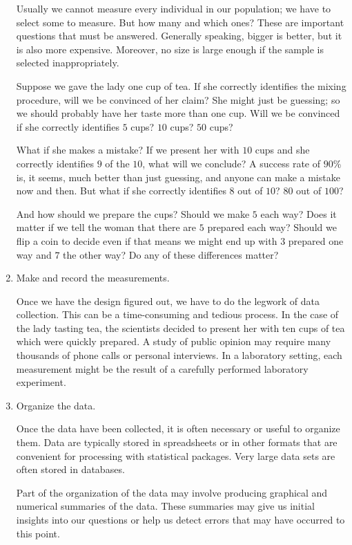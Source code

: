 \documentclass[twoside]{book}\usepackage[]{graphicx}\usepackage[]{xcolor}
\begin{document}
\begin{enumerate}
	Usually we cannot measure every individual in our population; we have 
	to select some to measure.  
	But how many and which ones?  
	These are important questions that must be answered.
	Generally speaking, bigger is better, but it is also more expensive.
	Moreover, no size is large enough if the sample is selected inappropriately.

	Suppose we gave the lady one cup of tea.  If she correctly identifies
	the mixing procedure, will we be convinced of her claim?  She might just
	be guessing; so we should probably have her taste more than one 
	cup.  Will we be convinced if she correctly identifies $5$ cups? $10$ cups?
	$50$ cups?

	What if she makes a mistake?  If we present her with $10$ cups and she
	correctly identifies $9$ of the $10$, what will we conclude?  
	A success rate of $90$\% is, it seems,
	much better than just guessing, and anyone can make a mistake now and then.
	But what if she correctly identifies $8$ out of $10$? $80$ out of $100$?
	
	And how should we prepare the cups?  Should we make $5$ each way?  
	Does it matter if we tell the woman that there are $5$ prepared 
	each way?
	Should we flip a coin to decide even if that means we might end 
	up with $3$ prepared one way and $7$ the other way?  
	Do any of these differences matter?

  \item
	Make and record the measurements.

	Once we have the design figured out, we have to do the legwork of 
	data collection.  This can be a time-consuming and tedious process.
	In the case of the lady tasting tea, the scientists decided to 
	present her with ten cups of tea which were quickly prepared.
	A study of public opinion may require many thousands of phone calls or 
	personal interviews.
	In a laboratory setting, each measurement might be the result 
	of a carefully performed laboratory experiment.

  \item Organize the data.

	Once the data have been collected, it is often necessary or useful
	to organize them.  Data are typically stored in spreadsheets or 
	in other formats that are convenient for processing with 
	statistical packages.  Very large data sets are often stored in 
	databases.  
	
	Part of the organization of the data may involve producing graphical and
	numerical summaries of the data.  These summaries may give us initial
	insights into our questions or help us detect errors that may have occurred
	to this point.


\end{enumerate}
\end{document}
